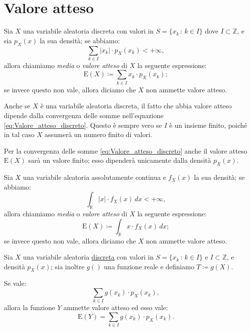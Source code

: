     \section{Valore atteso}\label{sec:Valore_atteso}
    \begin{defn}[discreto]\label{defn:Valore_atteso_discreto}
            Sia $X$ una variabile aleatoria discreta con valori in $S = \{x_k \,:\, k \in I\}$ dove $I \subset \mathbb{Z}$, e sia $p_X(x)$ la sua densità; se abbiamo: \[
                \sum_{k \in I} \left|x_k\right| \cdot p_X(x_k) < +\infty
            ,\] allora chiamiamo \textit{media} o \textit{valore atteso} di $X$ la seguente espressione:
            \begin{equation}\label{eq:Valore_atteso_discreto}
                \text{E}(X) \coloneqq \sum_{k \in I}x_k \cdot p_X(x_k)
            ;\end{equation}
            se invece questo non vale, allora diciamo che $X$ non ammette valore atteso.
        \end{defn}
        \begin{obsv}
            Anche se $X$ è una variabile aleatoria discreta, il fatto che abbia valore atteso dipende dalla convergenza delle somme nell'equazione \eqref{eq:Valore_atteso_discreto}. Questo è sempre vero se $I$ è un insieme finito, poiché in tal caso $X$ assumerà un numero finito di valori.

            Per la convergenza delle somme \eqref{eq:Valore_atteso_discreto} anche il valore atteso $\text{E}(X)$ sarà un valore finito; esso dipenderà unicamente dalla densità $p_X(x)$.
        \end{obsv}
        \begin{defn}[continuo]\label{defn:Valore_atteso_continuo}
            Sia $X$ una variabile aleatoria assolutamente continua e $f_X(x)$ la sua densità; se abbiamo: \[
                \int_{\mathbb{R}} |x| \cdot f_X(x)\, dx < +\infty 
            ,\] allora chiamiamo \textit{media} o \textit{valore atteso}  di $X$ la seguente espressione:
            \begin{equation}\label{eq:Valore_atteso_continuo}
                \text{E}(X) \coloneqq \int_{\mathbb{R}} x \cdot f_X(x)\, dx
            ;\end{equation}
            se invece questo non vale, allora diciamo che $X$ non ammette valore atteso.
        \end{defn}
        \begin{defn}[discreta]
            Sia $X$ una variabile aleatoria \underline{discreta} con valori in $S = \{x_k \,:\, k \in I\}$ e $I \subset \mathbb{Z}$, e densità $p_X(x)$; sia inoltre $g()$ una funzione reale  e definiamo $T \coloneqq  g(X)$.

            Se vale: \[
                \sum_{k \in I} g(x_k)  \cdot p_X(x_k)
            ,\] allora la funzione $Y$ ammette valore atteso ed esso vale:
            \begin{equation}\label{eq:Valore_atteso_funzione_discreta}
                \text{E}(Y) = \sum_{k \in I} g(x_k) \cdot p_X(x_k)
            .\end{equation}
        \end{defn}
